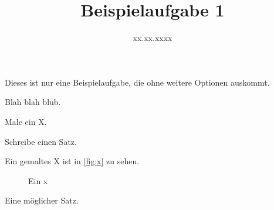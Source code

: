 \documentclass[a4paper]{scrartcl}
\date{xx.xx.xxxx}
\title{Beispielaufgabe 1}
\begin{document}
    \begin{aufgabenpoolHinweis}
        Dieses ist nur eine Beispielaufgabe, die ohne weitere Optionen auskommt.
    \end{aufgabenpoolHinweis}

    \begin{aufgabe}[subtitle=Erste Beispielaufgabe]
        Blah blah blub.

        \begin{teilaufgaben}
            \teilaufgabe[2] Male ein X.

            \teilaufgabe[3] Schreibe einen Satz.
        \end{teilaufgaben}
    \end{aufgabe}
    \begin{loesung}
        \begin{teilaufgaben}
            \teilaufgabe Ein gemaltes X ist in \autoref{fig:x} zu sehen.
                \begin{figure}[ht]
                    \centering
                    
                    \caption{Ein x}
                    \label{fig:x}
                \end{figure}
            \teilaufgabe Eine möglicher Satz.
        \end{teilaufgaben}
    \end{loesung}
\end{document}
